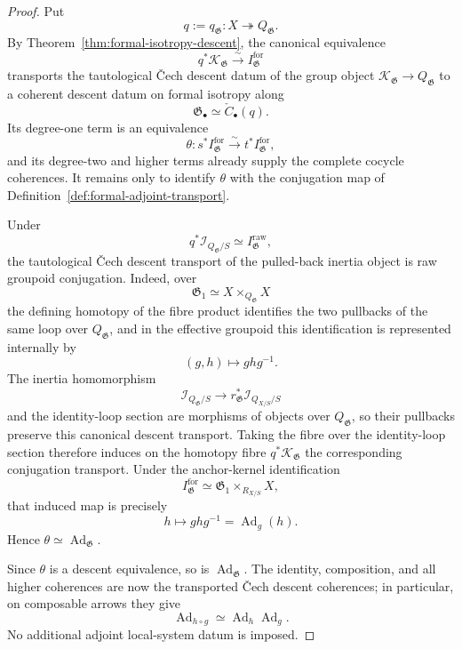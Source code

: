 \begin{proof}
Put
\[
    q:=q_{\mathfrak G}:X\twoheadrightarrow Q_{\mathfrak G}.
\]
By Theorem~\ref{thm:formal-isotropy-descent}, the canonical equivalence
\[
    q^*\mathcal K_{\mathfrak G}
    \xrightarrow{\sim}
    I^{\mathrm{for}}_{\mathfrak G}
\]
transports the tautological \v{C}ech descent datum of the group object
$\mathcal K_{\mathfrak G}\to Q_{\mathfrak G}$ to a coherent descent datum on
formal isotropy along
\[
    \mathfrak G_\bullet
    \simeq
    \check C_\bullet(q).
\]
Its degree-one term is an equivalence
\[
    \theta:
    s^*I^{\mathrm{for}}_{\mathfrak G}
    \xrightarrow{\sim}
    t^*I^{\mathrm{for}}_{\mathfrak G},
\]
and its degree-two and higher terms already supply the complete cocycle
coherences.  It remains only to identify $\theta$ with the conjugation map of
Definition~\ref{def:formal-adjoint-transport}.

Under
\[
    q^*\mathcal I_{Q_{\mathfrak G}/S}
    \simeq
    I^{\mathrm{raw}}_{\mathfrak G},
\]
the tautological \v{C}ech descent transport of the pulled-back inertia object
is raw groupoid conjugation.  Indeed, over
\[
    \mathfrak G_1
    \simeq
    X\times_{Q_{\mathfrak G}}X
\]
the defining homotopy of the fibre product identifies the two pullbacks of
the same loop over $Q_{\mathfrak G}$, and in the effective groupoid this
identification is represented internally by
\[
    (g,h)\longmapsto ghg^{-1}.
\]
The inertia homomorphism
\[
    \mathcal I_{Q_{\mathfrak G}/S}
    \longrightarrow
    r_{\mathfrak G}^*\mathcal I_{Q_{X/S}/S}
\]
and the identity-loop section are morphisms of objects over
$Q_{\mathfrak G}$, so their pullbacks preserve this canonical descent
transport.  Taking the fibre over the identity-loop section therefore
induces on the homotopy fibre $q^*\mathcal K_{\mathfrak G}$ the corresponding
conjugation transport.  Under the anchor-kernel identification
\[
    I^{\mathrm{for}}_{\mathfrak G}
    \simeq
    \mathfrak G_1\times_{R_{X/S}}X,
\]
that induced map is precisely
\[
    h\longmapsto ghg^{-1}
    =
    \operatorname{Ad}_g(h).
\]
Hence $\theta\simeq\operatorname{Ad}_{\mathfrak G}$.

Since $\theta$ is a descent equivalence, so is
$\operatorname{Ad}_{\mathfrak G}$.  The identity, composition, and all higher
coherences are now the transported \v{C}ech descent coherences; in particular,
on composable arrows they give
\[
    \operatorname{Ad}_{h\circ g}
    \simeq
    \operatorname{Ad}_h\operatorname{Ad}_g.
\]
No additional adjoint local-system datum is imposed.
\end{proof}

